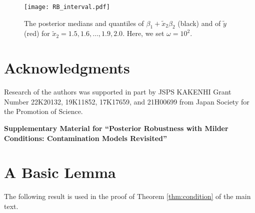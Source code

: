 \documentclass[12pt]{article}
\def\be{{\beta}}
\def\om{{\omega}}
\def\xt{{\tilde x}}
\def\be{{\beta}}
\def\om{{\omega}}
\def\yt{{\tilde y}}
\begin{document}
\begin{figure}[H]%
\centering
\texttt{[image: RB\_interval.pdf]}
\caption{The posterior medians and quantiles of $\be _1 + \xt _2 \be _2$ (black) and of $\yt $ (red) for $\xt _2 = 1.5, 1.6, \dots , 1.9, 2.0$. 
Here, we set $\om = 10^2$. }
\label{fig:prediction} 
\end{figure}%













\section*{Acknowledgments}
%
Research of the authors was supported in part by JSPS KAKENHI Grant Number 22K20132, 19K11852, 17K17659, and 21H00699 from Japan Society for the Promotion of Science. 

















\newpage
\setcounter{page}{1}
\setcounter{equation}{0}
\renewcommand{\theequation}{S\arabic{equation}}
\setcounter{section}{0}
\renewcommand{\thesection}{S\arabic{section}}
\setcounter{table}{0}
\renewcommand{\thetable}{S\arabic{table}}
\setcounter{figure}{0}
\renewcommand{\thefigure}{S\arabic{figure}}
%



\begin{center}
{\LARGE\bf Supplementary Material for ``Posterior Robustness with Milder Conditions: Contamination Models Revisited''}
\end{center}


%



%

\section{A Basic Lemma}
The following result is used in the proof of Theorem \ref{thm:condition} of the main text. 
\end{document}
